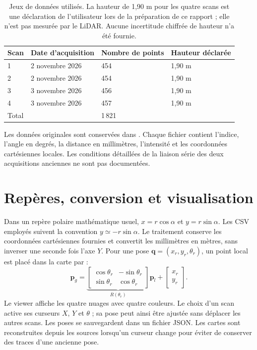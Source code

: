 \documentclass[11pt,a4paper]{article}
\begin{document}
\begin{table}[H]\centering
\begin{tabular}{llll}
\toprule Scan & Date d'acquisition & Nombre de points & Hauteur déclarée \\
\midrule
1 & 2 novembre 2026 & 454 & 1,90 m \\
2 & 2 novembre 2026 & 454 & 1,90 m \\
3 & 3 novembre 2026 & 456 & 1,90 m \\
4 & 3 novembre 2026 & 457 & 1,90 m \\
\midrule Total & & 1\,821 & \\
\bottomrule
\end{tabular}
\caption{Jeux de données utilisés. La hauteur de 1,90 m pour les quatre scans est une déclaration de l'utilisateur lors de la préparation de ce rapport ; elle n'est pas mesurée par le LiDAR. Aucune incertitude chiffrée de hauteur n'a été fournie.}
\end{table}
Les données originales sont conservées dans . Chaque fichier contient l'indice, l'angle en degrés, la distance en millimètres, l'intensité et les coordonnées cartésiennes locales. Les conditions détaillées de la liaison série des deux acquisitions anciennes ne sont pas documentées.

\section{Repères, conversion et visualisation}
Dans un repère polaire mathématique usuel, $x=r\cos\alpha$ et $y=r\sin\alpha$. Les CSV employés suivent la convention $y\simeq-r\sin\alpha$. Le traitement conserve les coordonnées cartésiennes fournies et convertit les millimètres en mètres, sans inverser une seconde fois l'axe $Y$.
Pour une pose $\mathbf{q}=(x_r,y_r,\theta_r)$, un point local est placé dans la carte par :
\[
 \mathbf p_g=\underbrace{\begin{bmatrix}\cos\theta_r&-\sin\theta_r\\\sin\theta_r&\cos\theta_r\end{bmatrix}}_{R(\theta_r)}\mathbf p_l+\begin{bmatrix}x_r\\y_r\end{bmatrix}.
\]
Le viewer affiche les quatre nuages avec quatre couleurs. Le choix d'un scan active ses curseurs $X$, $Y$ et $\theta$ ; sa pose peut ainsi être ajustée sans déplacer les autres scans. Les poses se sauvegardent dans un fichier JSON. Les cartes sont reconstruites depuis les sources lorsqu'un curseur change pour éviter de conserver des traces d'une ancienne pose.
\end{document}
